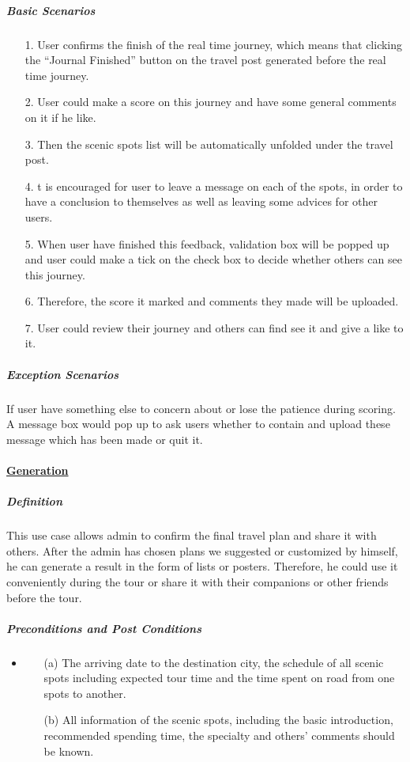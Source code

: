 \documentclass[10pt]{article}
\begin{document}
\begin{itemize}
		\subparagraph{Basic Scenarios}
		\begin{itemize}
			\item[1.] User confirms the finish of the real time journey, which means that clicking the “Journal Finished” button on the travel post generated before the real time journey.
			\item[2.]User could make a score on this journey and have some general comments on it if he like.
			\item[3.]Then the scenic spots list will be automatically unfolded under the travel post.
			\item[4.]t is encouraged for user to leave a message on each of the spots, in order to have a conclusion to themselves as well as leaving some advices for other users.
			\item[5.]When user have finished this feedback, validation box will be popped up and user could make a tick on the check box to decide whether others can see this journey.
			\item[6.]Therefore, the score it marked and comments they made will be uploaded.
			\item[7.]User could review their journey and others can find see it and give a like to it.
			
		 \end{itemize}
		 
		 \subparagraph{Exception Scenarios}
		 If user have something else to concern about or lose the patience during scoring. A message box would pop up to ask users whether to contain and upload these message which has been made or quit it.

		 \paragraph{\underline{Generation}}
		 \subparagraph{Definition}
		 This use case allows admin to confirm the final travel plan and share it with others. After the admin has chosen plans we suggested or customized by himself, he can generate a result in the form of lists or posters. Therefore, he could use it conveniently during the tour or share it with their companions or other friends before the tour.

		 \subparagraph{Preconditions and Post Conditions}
		 \begin{itemize}
			 \item \begin{itemize}
				 \item[(a)] The arriving date to the destination city, the schedule of all scenic spots including expected tour time and the time spent on road from one spots to another.
				 \item[(b)] All information of the scenic spots, including the basic introduction, recommended spending time, the specialty and others’ comments should be known. 
			 \end{itemize}


\end{itemize}
\end{itemize}
\end{document}
